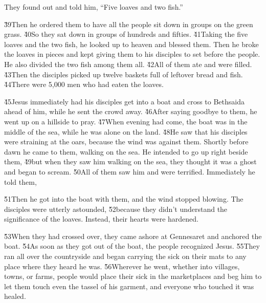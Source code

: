 They found out and told him, ``Five loaves and two fish.''

\v{39}Then he ordered them to have all the people sit down in groups on the green grass. \v{40}So they sat down in groups of hundreds and fifties. \v{41}Taking the five loaves and the two fish, he looked up to heaven and blessed them. Then he broke the loaves in pieces and kept giving them to his disciples to set before the people. He also divided the two fish among them all. \v{42}All of them ate and were filled. \v{43}Then the disciples picked up twelve baskets full of leftover bread and fish. \v{44}There were 5,000 men who had eaten the loaves.

\v{45}Jesus immediately had his disciples get into a boat and cross to Bethsaida ahead of him, while he sent the crowd away. \v{46}After saying goodbye to them, he went up on a hillside to pray. \v{47}When evening had come, the boat was in the middle of the sea, while he was alone on the land. \v{48}He saw that his disciples were straining at the oars, because the wind was against them. Shortly before dawn he came to them, walking on the sea. He intended to go up right beside them, \v{49}but when they saw him walking on the sea, they thought it was a ghost and began to scream. \v{50}All of them saw him and were terrified. Immediately he told them, 

\v{51}Then he got into the boat with them, and the wind stopped blowing. The disciples were utterly astounded, \v{52}because they didn't understand the significance of the loaves. Instead, their hearts were hardened.

\v{53}When they had crossed over, they came ashore at Gennesaret and anchored the boat. \v{54}As soon as they got out of the boat, the people recognized Jesus. \v{55}They ran all over the countryside and began carrying the sick on their mats to any place where they heard he was. \v{56}Wherever he went, whether into villages, towns, or farms, people would place their sick in the marketplaces and beg him to let them touch even the tassel of his garment, and everyone who touched it was healed.

